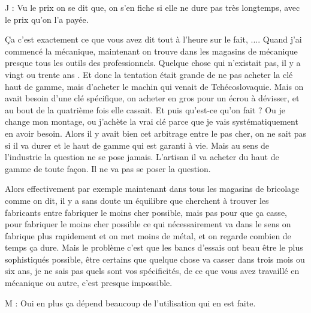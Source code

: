 \begin{description}
\vspace{1\baselineskip}

J : Vu le prix on se dit que, on s'en fiche si elle ne dure pas très longtemps, avec le prix qu'on l'a payée.

\vspace{1\baselineskip}

Ça c'est exactement ce que vous avez dit tout à l'heure sur le fait, ....
Quand j'ai commencé la mécanique, maintenant on trouve dans les magasins de mécanique presque tous les outils des professionnels. Quelque chose qui n'existait pas, il y a vingt ou trente ans . Et donc la tentation était grande de ne pas acheter la clé haut de gamme, mais d'acheter le machin qui venait de Tchécoslovaquie. Mais on avait besoin d'une clé spécifique, on acheter en gros pour un écrou à dévisser, et au bout de la quatrième fois elle cassait. Et puis qu'est-ce qu'on fait ? Ou je change mon montage, ou j'achète la vrai clé parce que je vais systématiquement en avoir besoin. Alors il y avait bien cet arbitrage entre le pas cher, on ne sait pas si il va durer et le haut de gamme qui est garanti à vie. Mais au sens de l'industrie la question ne se pose jamais. L'artisan il va acheter du haut de gamme de toute façon. Il ne va pas se poser la question. 

Alors effectivement par exemple maintenant dans tous les magasins de bricolage comme on dit, il y a sans doute un équilibre que cherchent à trouver les fabricants entre fabriquer le moins cher possible, mais pas pour que ça casse, pour fabriquer le moins cher possible ce qui nécessairement va dans le sens on fabrique plus rapidement et on met moins de métal, et on regarde combien de temps ça dure. Mais le problème c'est que les bancs d'essais ont beau être le plus sophistiqués possible, être certains que quelque chose va casser dans trois mois ou six ans, je ne sais pas quels sont vos spécificités, de ce que vous avez travaillé en mécanique ou autre, c'est presque impossible.

\vspace{1\baselineskip}

M : Oui en plus ça dépend beaucoup de l'utilisation qui en est faite.

\vspace{1\baselineskip}


\end{description}
